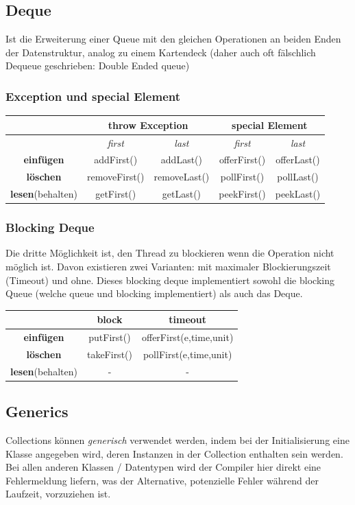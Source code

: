 \documentclass[12pt,a4]{article}
\begin{document}
	\subsection{Deque}
	Ist die Erweiterung einer Queue mit den gleichen Operationen an beiden Enden der Datenstruktur, analog zu einem Kartendeck (daher auch oft fälschlich Dequeue geschrieben: Double Ended queue)
	
	\subsubsection{Exception und special Element}
	
\begin{tabular}{|c|c|c|c|c|}
	\hline 
	&\multicolumn{2}{|c|}{\textbf{throw Exception}}&\multicolumn{2}{|c|}{\textbf{special Element}} \\
	\hline 
	&\textit{first}&\textit{last}&\textit{first}&\textit{last}  \\ 
	\hline 
	\textbf{einfügen}&addFirst()&addLast()&offerFirst()&offerLast()\\ 
	\hline 
	\textbf{löschen}&  removeFirst()&removeLast()&pollFirst()&pollLast()\\ 
	\hline 
	\textbf{lesen}(behalten)&getFirst()&getLast()&peekFirst()&peekLast()\\ 
	\hline 
\end{tabular} 

	\subsubsection{Blocking Deque}
	Die dritte Möglichkeit ist, den Thread zu blockieren wenn die Operation nicht möglich ist. Davon existieren zwei Varianten: mit maximaler Blockierungszeit (Timeout) und ohne. Dieses blocking deque implementiert sowohl die blocking Queue (welche queue und blocking implementiert) als auch das Deque.
	\begin{center}
	\begin{tabular}{|c|c|c|}
		\hline 
		&\textbf{block}&\textbf{timeout}\\ 
		\hline 
		\textbf{einfügen}&putFirst()&offerFirst(e,time,unit)\\ 
		\hline 
		\textbf{löschen}&takeFirst()&pollFirst(e,time,unit)\\ 
		\hline 
		\textbf{lesen}(behalten)&-&-  \\ 
		\hline 
	\end{tabular} 
	\end{center}
	\subsection{Generics}
	Collections können \textit{generisch} verwendet werden, indem bei der Initialisierung eine Klasse angegeben wird, deren Instanzen in der Collection enthalten sein werden. Bei allen anderen Klassen / Datentypen wird der Compiler hier direkt eine Fehlermeldung liefern, was der Alternative, potenzielle Fehler während der Laufzeit, vorzuziehen ist.
\end{document}
